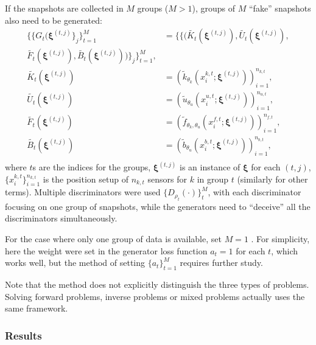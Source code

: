 \documentclass[conference,compsoc]{IEEEtran}
\begin{document}
If the snapshots are collected in $M$ groups ($M>1$), groups of $M$ ``fake'' snapshots also need to be generated:
\begin{equation} \label{eqn:G_multi}
\begin{aligned}
\{\{G_t(\boldsymbol{\xi}^{(t,j)}\}_j\}_{t=1}^M & = \{\{(\tilde{K_t}(\boldsymbol{\xi}^{(t,j)}), \tilde{U_t}(\boldsymbol{\xi}^{(t,j)}),\\ \tilde{F_t}(\boldsymbol{\xi}^{(t,j)}),\tilde{B_t}(\boldsymbol{\xi}^{(t,j)}))\}_j\}_{t=1}^{M},\\
\tilde{K_t}(\boldsymbol{\xi}^{(t,j)}) & = (\tilde{k}_{\theta_k}(x_i^{k,t};\boldsymbol{\xi}^{(t,j)}))_{i=1}^{n_{k,t}},\\
\tilde{U_t}(\boldsymbol{\xi}^{(t,j)}) & = (\tilde{u}_{\theta_u}(x_i^{u,t};\boldsymbol{\xi}^{(t,j)}))_{i=1}^{n_{u,t}},\\
\tilde{F_t}(\boldsymbol{\xi}^{(t,j)}) & = (\tilde{f}_{\theta_k,\theta_u}(x_i^{f,t};\boldsymbol{\xi}^{(t,j)}))_{i=1}^{n_{f,t}},\\
\tilde{B_t}(\boldsymbol{\xi}^{(t,j)}) & = (\tilde{b}_{\theta_u}(x_i^{b,t};\boldsymbol{\xi}^{(t,j)}))_{i=1}^{n_{b,t}},\\
\end{aligned}
\end{equation}
where $t$s are the indices for the groups, $\boldsymbol{\xi}^{(t,j)}$ is an instance of $\boldsymbol{\xi}$ for each $(t,j)$, $\{x^{k,t}_i\}_{i=1}^{n_{k,t}}$ is the position setup of $n_{k,t}$ sensors for $k$ in group $t$ (similarly for other terms). 
%
Multiple discriminators were used $\{D_{\rho_t}(\cdot)\}_t^M$, with each discriminator focusing on one group of snapshots, while the generators need to ``deceive'' all the discriminators simultaneously\cite{yang2018physics}. 

For the case where only one group of data is available, set $M = 1$ . For simplicity, here the weight were set in the generator loss function $a_t = 1$ for each $t$, which works well, but the method of setting $\{a_t\}_{t=1}^M$ requires further study.


Note that the method does not explicitly distinguish the three types of problems\cite{yang2018physics}. Solving forward problems, inverse problems or mixed problems actually uses the same framework\cite{lou2020physics}.
 


\subsubsection{Results}
\end{document}
